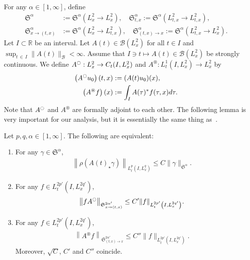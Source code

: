 \documentclass[10pt,a4paper]{amsart}
\newcommand{\oast}{\circledast}
\newcommand{\CB}{\mathcal{B}}
\newcommand{\FS}{\mathfrak{S}}
\newcommand{\al}{\alpha}
\newcommand{\ga}{\gamma}
\newcommand{\ta}{\tau}
\newcommand{\rh}{\rho}
\newcommand{\I}{\infty}
\newcommand{\tx}{{t,x}}
\newcommand{\st}{\star}
\newcommand{\R}{\mathbb{R}}
\newcommand{\oc}{\ocircle}
\newcommand{\os}{\oast}
\begin{document}
For any $\al \in [1, \I]$, define
\begin{align}
\FS^\alpha &:= \FS^\alpha\left(L^2_x \to L^2_x\right),
\quad \FS^\al_{t,x} := \FS^\al\left(L^2_{t,x} \to L^2_\tx\right), \\
\FS^\al_{x \to (t,x)} &:= \FS^\al\left(L^2_x \to L^2_{t,x}\right),
\quad \FS^\alpha_{(t,x) \to x} := \FS^\al\left(L^2_{t,x} \to L^2_x\right).
\end{align}
Let $I \subset \R$ be an interval. Let $A(t) \in \CB(L^2_x)$ for all $t \in I$ and $\sup_{t \,\in\,I} \|A(t)\|_{\CB} < \I$. Assume that $I \ni t \mapsto A(t) \in \CB(L^2_x)$ be strongly continuous. We define $A^\ocircle : L^2_x \to C_t(I,L^2_x)$ and $A^\oast : L^1_t(I,L^2_x) \to L^2_x$ by
\begin{align}
\left(A^\ocircle u_0\right)(t,x) &:= (A(t)u_0)(x), \\
\left(A^\oast f\right)(x) &:= \int_I A(\ta)^* f(\ta,x) d\ta.
\end{align}
Note that $A^\ocircle$ and $A^\oast$ are formally adjoint to each other. The following lemma is very important for our analysis, but it is essentially the same thing as~\cite[Lemma~3]{2017FS}.
\begin{lemm} \label{DP}
Let $p,q,\al \in [1,\I]$. The following are equivalent:
\begin{enumerate}
\item\label{lemm3.2.1} For any $\ga \in \FS^\al$,
\begin{align}\label{SS}
\left\|\rh(A(t)_\st \ga)\right\|_{L^p_t\left(I,L^q_x\right)} \le C \|\ga\|_{\FS^\al}.
\end{align}
\item\label{lemm3.2.2} For any $f \in L^{2p'}_t(I,L^{2q'}_x)$,
\begin{align}\label{HSS}
\left\|f A^\oc\right\|_{\FS^{2\al'}_{x \to (\tx)}} \le C'\|f\|_{L^{2p'}_t\left(I,L^{2q'}_x\right)}.
\end{align}
\item\label{lemm3.2.3} For any $f \in L^{2p'}_t(I,L^{2q'}_x)$,
\begin{align}\label{HSS-second}
\left\|A^\os f\right\|_{\FS^{2\al'}_{(\tx) \to x}} \le C''\|f\|_{L^{2p'}_t\left(I,L^{2q'}_x\right)}.
\end{align}
Moreover, $\sqrt{C}$, $C'$ and $C''$ coincide.
\end{enumerate}
\end{lemm}
\end{document}

